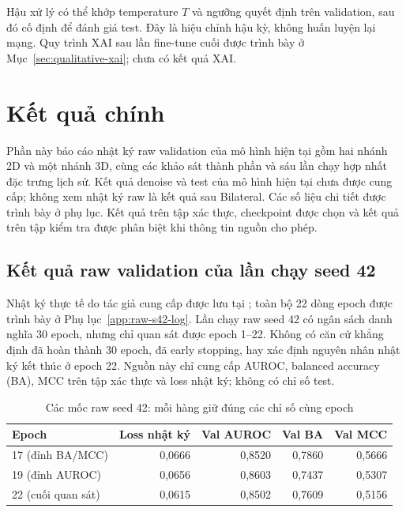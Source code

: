 \documentclass[14pt,a4paper,oneside]{extreport}
\begin{document}
Hậu xử lý có thể khớp temperature $T$ và ngưỡng quyết định trên
validation, sau đó cố định để đánh giá test. Đây là hiệu chỉnh hậu kỳ,
không huấn luyện lại mạng. Quy trình XAI sau lần fine-tune cuối được
trình bày ở Mục~\ref{sec:qualitative-xai}; chưa có kết quả XAI.
\FloatBarrier

\section{Kết quả chính}
\label{sec:main-results}
Phần này báo cáo nhật ký raw validation của mô hình hiện tại gồm hai
nhánh 2D và một nhánh 3D, cùng các khảo sát thành phần và sáu lần chạy
hợp nhất đặc trưng lịch sử. Kết quả denoise và test của mô hình hiện tại
chưa được cung cấp; không xem nhật ký raw là kết quả sau Bilateral.
Các số liệu chi tiết được trình bày ở phụ lục. Kết quả trên tập xác thực,
checkpoint được chọn và kết quả trên tập kiểm tra được phân biệt khi thông tin nguồn cho phép.

\subsection{Kết quả raw validation của lần chạy seed 42}
\label{sec:raw-s42-results}
Nhật ký thực tế do tác giả cung cấp được lưu tại
; toàn bộ 22 dòng epoch được
trình bày ở Phụ lục~\ref{app:raw-s42-log}. Lần chạy raw seed 42 có
ngân sách danh nghĩa 30 epoch, nhưng chỉ quan sát được epoch 1--22.
Không có căn cứ khẳng định đã hoàn thành 30 epoch, đã early stopping,
hay xác định nguyên nhân nhật ký kết thúc ở epoch 22. Nguồn này chỉ
cung cấp AUROC, balanced accuracy (BA), MCC trên tập xác thực và loss
nhật ký; không có chỉ số test.

\begin{table}[htbp]
  \centering
  \caption{Các mốc raw seed 42: mỗi hàng giữ đúng các chỉ số cùng epoch}
  \label{tab:raw-s42-summary}
  \setlength{\tabcolsep}{5pt}
  \begin{tabular}{@{}lrrrr@{}}
    \toprule
    Epoch & Loss nhật ký & Val AUROC & Val BA & Val MCC\\
    \midrule
    17 (đỉnh BA/MCC) & 0,0666 & 0,8520 & 0,7860 & 0,5666\\
    19 (đỉnh AUROC) & 0,0656 & 0,8603 & 0,7437 & 0,5307\\
    22 (cuối quan sát) & 0,0615 & 0,8502 & 0,7609 & 0,5156\\
    \bottomrule
  \end{tabular}
\end{table}
\end{document}

